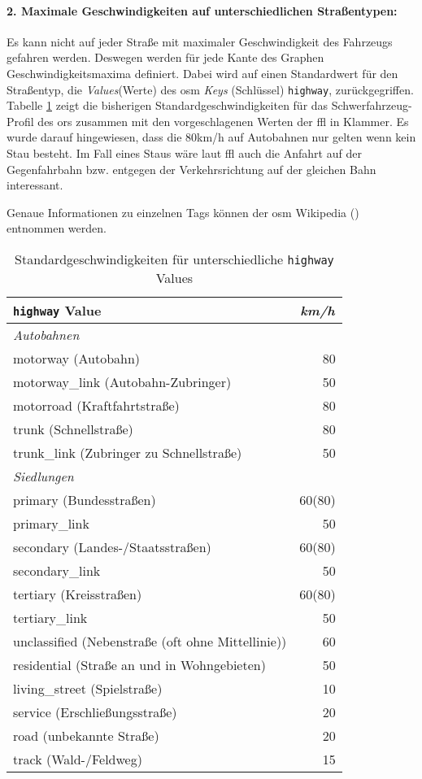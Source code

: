 \paragraph*{2. Maximale Geschwindigkeiten auf unterschiedlichen Straßentypen:}
\label{frage2}
\par
Es kann nicht auf jeder Straße mit maximaler Geschwindigkeit des Fahrzeugs gefahren werden.
Deswegen werden für jede Kante des Graphen Geschwindigkeitsmaxima definiert.
Dabei wird auf einen Standardwert für den Straßentyp, die \textit{Values}(Werte) des \gls{osm} \textit{Keys} (Schlüssel) \texttt{highway}, zurückgegriffen.
Tabelle \ref{tab:speedinfo} zeigt die bisherigen Standardgeschwindigkeiten für das Schwerfahrzeug-Profil des \gls{ors} zusammen mit den vorgeschlagenen Werten der \gls{ffl} in Klammer.
Es wurde darauf hingewiesen, dass die 80km/h auf Autobahnen nur gelten wenn kein Stau besteht.
Im Fall eines Staus wäre laut \gls{ffl} auch die Anfahrt auf der Gegenfahrbahn bzw. entgegen der Verkehrsrichtung auf der gleichen Bahn interessant.

Genaue Informationen zu einzelnen Tags können der \gls{osm} Wikipedia (\cite{osmwiki}) entnommen werden.

\begin{table}[htb]
\centering
\caption{Standardgeschwindigkeiten für unterschiedliche \texttt{highway} Values}
\label{tab:speedinfo}
\begin{tabular}{|l|r|}
\hline
\multicolumn{1}{|l|}{\texttt{highway} Value} & \multicolumn{1}{c|}{\textit{km/h}} \\
\hline
\multicolumn{2}{|l|}{\textit{Autobahnen}} \\
\hline
motorway (Autobahn) & 80 \\
motorway\_link (Autobahn-Zubringer) & 50 \\
motorroad (Kraftfahrtstraße) & 80 \\
trunk (Schnellstraße) & 80 \\
trunk\_link (Zubringer zu Schnellstraße) & 50 \\
\hline
\multicolumn{1}{|l}{\textit{Siedlungen}} & \multicolumn{1}{l|}{ } \\
\hline
primary (Bundesstraßen) & 60(80) \\
primary\_link  & 50 \\
secondary (Landes-/Staatsstraßen) & 60(80) \\
secondary\_link  & 50 \\
tertiary (Kreisstraßen) & 60(80) \\
tertiary\_link  & 50 \\
unclassified (Nebenstraße (oft ohne Mittellinie))  & 60 \\
residential (Straße an und in Wohngebieten) & 50 \\
living\_street (Spielstraße)  & 10 \\
service (Erschließungsstraße) & 20 \\
road (unbekannte Straße) & 20 \\
track (Wald-/Feldweg) & 15 \\
\hline
\end{tabular}
\end{table}

